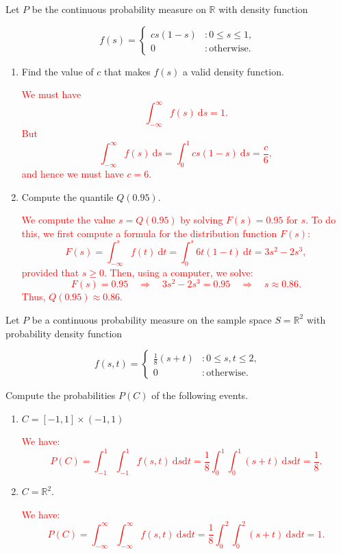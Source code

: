 \documentclass[12pt,reqno]{amsart}
\begin{document}
\bigskip
\prob Let $P$ be the continuous probability measure on $\mathbb{R}$ with density function

	\[
	f(s) = \begin{cases}
	cs(1-s) & : 0 \leq s \leq 1, \\
	0 & : \text{otherwise}.
	\end{cases}
	\]


\medskip
\begin{enumerate}
\item Find the value of $c$ that makes $f(s)$ a valid density function.
    
\bigskip
\textcolor{red}{We must have
	\[
	\int_{-\infty}^\infty f(s) \ \text{d} s = 1.
	\]
But
	\[
	\int_{-\infty}^\infty f(s) \ \text{d} s = \int_0^1 cs(1-s) \ \text{d} s = \frac{c}{6},
	\]
and hence we must have $c=6$.}
\bigskip

\item Compute the quantile $Q(0.95)$.
    
\bigskip
\textcolor{red}{We compute the value $s = Q(0.95)$ by solving $F(s) = 0.95$ for $s$. To do this, we first compute a formula for the distribution function $F(s)$:
	\[
	F(s) = \int_{-\infty}^s f(t) \ \text{d} t =  \int_{0}^s 6t(1-t) \ \text{d} t = 3 s^2 - 2 s^3,
	\]
provided that $s\geq 0$. Then, using a computer, we solve:
	\[
	F(s) = 0.95 \quad \Rightarrow \quad 3s^2-2s^3 = 0.95 \quad \Rightarrow \quad s\approx 0.86.
	\]
Thus, $Q(0.95) \approx 0.86$.}
\end{enumerate}












\bigskip
\prob Let $P$ be a continuous probability measure on the sample space $S=\mathbb{R}^2$ with probability density function

	\[
	f(s,t) = \begin{cases}
	\frac{1}{8}(s+t) & : 0\leq s,t \leq 2, \\
	0 & : \text{otherwise}.    
	\end{cases}
	\]

Compute the probabilities $P(C)$ of the following events.

\medskip
\begin{enumerate}
\item $C=[-1,1] \times (-1,1)$

\bigskip
\textcolor{red}{We have:
	\[
	P(C) = \int_{-1}^1 \int_{-1}^1 f(s,t) \ \text{d}s\text{d}t = \frac{1}{8} \int_0^1 \int_0^1 (s+t) \ \text{d}s\text{d}t = \frac{1}{8}.
	\]}
\bigskip

\item $C = \mathbb{R}^2$.

\bigskip
\textcolor{red}{We have:
	\[
	P(C) = \int_{-\infty}^\infty \int_{-\infty}^\infty f(s,t) \ \text{d}s\text{d}t = \frac{1}{8} \int_0^2 \int_0^2 (s+t) \ \text{d}s\text{d}t = 1.
	\]}
\end{enumerate}
\end{document}
